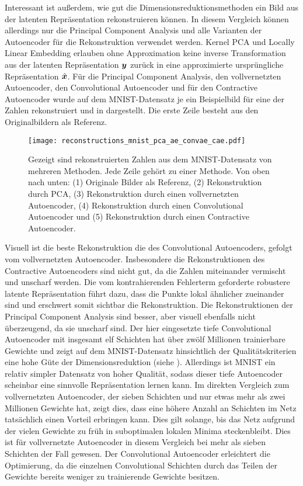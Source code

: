 Interessant ist außerdem, wie gut die Dimensionsreduktionsmethoden ein Bild aus der latenten
Repräsentation rekonstruieren können. In diesem Vergleich können allerdings nur die Principal
Component Analysis und alle Varianten der Autoencoder für die Rekonstruktion verwendet werden.
Kernel PCA und Locally Linear Embedding erlauben ohne Approximation keine inverse Transformation
aus der latenten Repräsentation $\bm{y}$ zurück in eine approximierte ursprüngliche
Repräsentation $\hat{\bm{x}}$. Für die Principal Component Analysis, den vollvernetzten
Autoencoder, den Convolutional Autoencoder und für den Contractive Autoencoder wurde auf dem
MNIST-Datensatz je ein Beispielbild für eine der Zahlen rekonstruiert und in
 dargestellt. Die erste Zeile besteht aus den Originalbildern als
Referenz.
\begin{figure}[ht]
	\centering
	\texttt{[image: reconstructions\_mnist\_pca\_ae\_convae\_cae.pdf]}
	\caption[Rekonstruierte MNIST-Zahlen]{Gezeigt sind rekonstruierten Zahlen aus dem MNIST-Datensatz von mehreren Methoden. Jede Zeile gehört zu einer Methode. Von oben nach unten: (1) Originale Bilder als Referenz, (2) Rekonstruktion durch PCA, (3) Rekonstruktion durch einen vollvernetzten Autoencoder, (4) Rekonstruktion durch einen Convolutional Autoencoder und (5) Rekonstruktion durch einen Contractive Autoencoder.}
	\label{fig:MNIST-reconstructions}
\end{figure}
Visuell ist die beste Rekonstruktion die des Convolutional Autoencoders, gefolgt vom vollvernetzten Autoencoder. Insbesondere die Rekonstruktionen des Contractive Autoencoders sind nicht gut, da die Zahlen miteinander vermischt und unscharf werden. Die vom kontrahierenden Fehlerterm geforderte robustere latente Repräsentation führt dazu, dass die Punkte lokal ähnlicher zueinander sind und erschwert somit sichtbar die Rekonstruktion. Die Rekonstruktionen der Principal Component Analysis sind besser, aber visuell ebenfalls nicht überzeugend, da sie unscharf sind. Der hier eingesetzte tiefe Convolutional Autoencoder mit insgesamt elf Schichten hat über zwölf Millionen trainierbare Gewichte und zeigt auf dem MNIST-Datensatz hinsichtlich der Qualitätskriterien eine hohe Güte der Dimensionsreduktion (siehe ). Allerdings ist MNIST ein relativ simpler Datensatz von hoher Qualität, sodass dieser tiefe Autoencoder scheinbar eine sinnvolle Repräsentation lernen kann. Im direkten Vergleich zum vollvernetzten Autoencoder, der sieben Schichten und nur etwas mehr als zwei Millionen Gewichte hat, zeigt dies, dass eine höhere Anzahl an Schichten im Netz tatsächlich einen Vorteil erbringen kann. Dies gilt solange, bis das Netz aufgrund der vielen Gewichte zu früh in suboptimalen lokalen Minima steckenbleibt. Dies ist für vollvernetzte Autoencoder in diesem Vergleich bei mehr als sieben Schichten der Fall gewesen. Der Convolutional Autoencoder erleichtert die Optimierung, da die einzelnen Convolutional Schichten durch das Teilen der Gewichte bereits weniger zu trainierende Gewichte besitzen.


